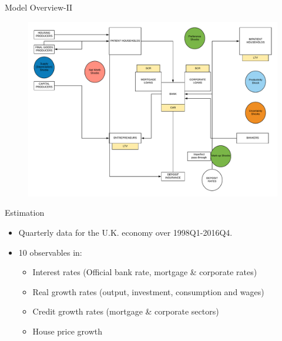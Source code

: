 \documentclass[8pt,aspectratio=169]{beamer}
\numberwithin{equation}{section}
\begin{document}
\begin{frame}{Model Overview-II}

\begin{figure}
\includegraphics[scale=0.4]{3d_flowchart_full.pdf}
\end{figure}



\end{frame}



\begin{frame}{Estimation}


\begin{itemize}

\item Quarterly data for the U.K. economy over 1998Q1-2016Q4. 
\vspace{5 mm}
\item 10 observables in: 
\vspace{5 mm}
\begin{itemize}
\item Interest rates (Official bank rate, mortgage \& corporate rates)
\vspace{3 mm}
\item Real growth rates (output, investment, consumption and wages)
\vspace{3 mm}
\item Credit growth rates (mortgage \& corporate sectors) 
\vspace{3 mm}
\item House price growth
\end{itemize}

\end{itemize}



\end{frame}
\end{document}

